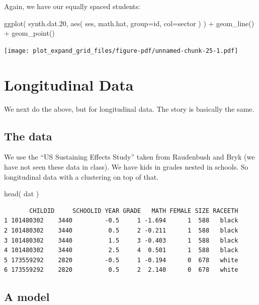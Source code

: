 \documentclass[
  letterpaper,
  DIV=11,
  numbers=noendperiod]{scrreprt}
\newenvironment{Shaded}{}{}
\newcommand{\AttributeTok}[1]{\textcolor[rgb]{0.49,0.56,0.16}{#1}}
\newcommand{\FloatTok}[1]{\textcolor[rgb]{0.25,0.63,0.44}{#1}}
\newcommand{\FunctionTok}[1]{\textcolor[rgb]{0.02,0.16,0.49}{#1}}
\newcommand{\NormalTok}[1]{#1}
\newcommand{\SpecialCharTok}[1]{\textcolor[rgb]{0.25,0.44,0.63}{#1}}
\begin{document}
Again, we have our equally spaced students:

\begin{Shaded}
\begin{Highlighting}[]
\FunctionTok{ggplot}\NormalTok{( synth.dat}\FloatTok{.20}\NormalTok{, }\FunctionTok{aes}\NormalTok{( ses, math.hat, }\AttributeTok{group=}\NormalTok{id, }\AttributeTok{col=}\NormalTok{sector ) ) }\SpecialCharTok{+}
  \FunctionTok{geom\_line}\NormalTok{() }\SpecialCharTok{+}
  \FunctionTok{geom\_point}\NormalTok{()}
\end{Highlighting}
\end{Shaded}

\texttt{[image: plot\_expand\_grid\_files/figure-pdf/unnamed-chunk-25-1.pdf]}

\section{Longitudinal Data}\label{longitudinal-data-1}

We next do the above, but for longitudinal data. The story is basically
the same.

\subsection{The data}\label{the-data}

We use the ``US Sustaining Effects Study'' taken from Raudenbush and
Bryk (we have not seen these data in class). We have kids in grades
nested in schools. So longitudinal data with a clustering on top of
that.

\begin{Shaded}
\begin{Highlighting}[]
\FunctionTok{head}\NormalTok{( dat )}
\end{Highlighting}
\end{Shaded}

\begin{verbatim}
       CHILDID     SCHOOLID YEAR GRADE   MATH FEMALE SIZE RACEETH
1 101480302    3440         -0.5     1 -1.694      1  588   black
2 101480302    3440          0.5     2 -0.211      1  588   black
3 101480302    3440          1.5     3 -0.403      1  588   black
4 101480302    3440          2.5     4  0.501      1  588   black
5 173559292    2820         -0.5     1 -0.194      0  678   white
6 173559292    2820          0.5     2  2.140      0  678   white
\end{verbatim}

\subsection{A model}\label{a-model}
\end{document}
